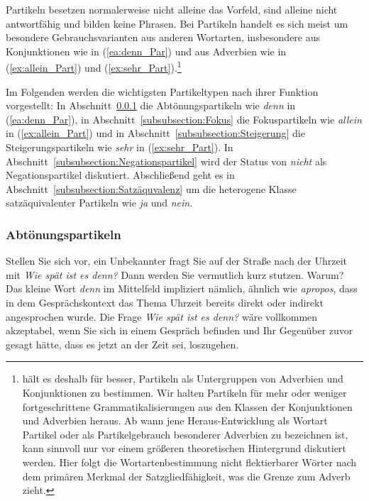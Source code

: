 Partikeln besetzen normalerweise nicht alleine das Vorfeld, sind alleine nicht antwortfähig und bilden keine Phrasen. Bei Partikeln handelt es sich meist um besondere Gebrauchsvarianten aus anderen Wortarten, insbesondere aus Konjunktionen wie in (\ref{ea:denn_Par}) und aus Adverbien wie in (\ref{ex:allein_Part}) und (\ref{ex:sehr_Part}).\footnote{\citet[236]{Eisenberg2020_Satz} hält es deshalb für besser, Partikeln als Untergruppen von Adverbien und Konjunktionen zu bestimmen. Wir halten Partikeln für mehr oder weniger fortgeschrittene Grammatikalisierungen aus den Klassen der Konjunktionen und Adverbien heraus. Ab wann jene Heraus-Entwicklung als Wortart Partikel oder als Partikelgebrauch besonderer Adverbien zu bezeichnen ist, kann sinnvoll nur vor einem größeren theoretischen Hintergrund diskutiert werden. Hier folgt die Wortartenbestimmung nicht flektierbarer Wörter nach dem primären Merkmal der Satzgliedfähigkeit, was die Grenze zum Adverb zieht.}

Im Folgenden werden die wichtigsten Partikeltypen nach ihrer Funktion vorgestellt: In Abschnitt~\ref{subsubsection:Abtönung} die Abtönungspartikeln wie \textit{denn} in (\ref{ea:denn_Par}), in Abschnitt~\ref{subsubsection:Fokus} die Fokuspartikeln wie \textit{allein} in (\ref{ex:allein_Part}) und in Abschnitt~\ref{subsubsection:Steigerung} die Steigerungspartikeln wie \textit{sehr} in (\ref{ex:sehr_Part}). In Abschnitt~\ref{subsubsection:Negationspartikel} wird der Status von \textit{nicht} als Negationspartikel diskutiert. Abschließend geht es in Abschnitt~\ref{subsubsection:Satzäquvalenz} um die heterogene Klasse satzäquivalenter Partikeln wie \textit{ja} und \textit{nein}.


\subsubsection{Abtönungspartikeln}\label{subsubsection:Abtönung}

Stellen Sie sich vor, ein Unbekannter fragt Sie auf der Straße nach der Uhrzeit mit \textit{Wie spät ist es denn?} Dann werden Sie vermutlich kurz stutzen. Warum? Das kleine Wort \textit{denn} im Mittelfeld impliziert nämlich, ähnlich wie \textit{apropos}, dass in dem Gesprächskontext das Thema Uhrzeit bereits direkt oder indirekt angesprochen wurde. Die Frage \textit{Wie spät ist es denn?} wäre vollkommen akzeptabel, wenn Sie sich in einem Gespräch befinden und Ihr Gegenüber zuvor gesagt hätte, dass es jetzt an der Zeit sei, loszugehen.

